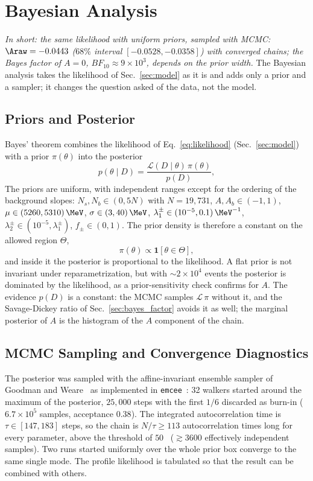 \section{Bayesian Analysis}
\label{sec:bayesian}
\emph{In short: the same likelihood with uniform priors, sampled with MCMC: $\Araw=-0.0443$ ($68\%$ interval $[-0.0528,-0.0358]$) with converged chains; the Bayes factor of $A=0$, $BF_{10}\approx9\times10^3$, depends on the prior width.}
The Bayesian analysis takes the likelihood of Sec.~\ref{sec:model} as it is and adds only a prior and a sampler; it changes the question asked of the data, not the model.
\subsection{Priors and Posterior}
\label{sec:bayes_prior}
Bayes' theorem combines the likelihood of Eq.~\eqref{eq:likelihood} (Sec.~\ref{sec:model}) with a prior $\pi(\theta)$ into the posterior
\begin{equation}
p(\theta\mid D)=\frac{\mathcal{L}(D\mid\theta)\,\pi(\theta)}{p(D)},
\label{eq:bayes}
\end{equation}
The priors are uniform, with independent ranges except for the ordering of the background slopes: $N_s,N_b\in(0,5N)$ with $N=19{,}731$, $A,A_b\in(-1,1)$, $\mu\in(5260,5310)\,\MeV$, $\sigma\in(3,40)\,\MeV$, $\lambda_1^{\pm}\in(10^{-5},0.1)\,\MeV^{-1}$, $\lambda_2^{\pm}\in(10^{-5},\lambda_1^{\pm})$, $f_{\pm}\in(0,1)$. The prior density is therefore a constant on the allowed region $\Theta$,
\begin{equation}
\pi(\theta)\propto\mathbf{1}\left[\theta\in\Theta\right],
\label{eq:prior}
\end{equation}
and inside it the posterior is proportional to the likelihood. A flat prior is not invariant under reparametrization, but with $\sim$$2\times10^4$ events the posterior is dominated by the likelihood, as a prior-sensitivity check confirms for $A$. The evidence $p(D)$ is a constant: the MCMC samples $\mathcal{L}\,\pi$ without it, and the Savage-Dickey ratio of Sec.~\ref{sec:bayes_factor} avoids it as well; the marginal posterior of $A$ is the histogram of the $A$ component of the chain.
\subsection{MCMC Sampling and Convergence Diagnostics}
\label{sec:bayes_mcmc}
The posterior was sampled with the affine-invariant ensemble sampler of Goodman and Weare~\cite{goodman_weare} as implemented in \texttt{emcee}~\cite{emcee}: 32 walkers started around the maximum of the posterior, $25{,}000$ steps with the first $1/6$ discarded as burn-in ($6.7\times10^5$ samples, acceptance $0.38$). The integrated autocorrelation time is $\tau\in[147,183]$ steps, so the chain is $N/\tau\geq113$ autocorrelation times long for every parameter, above the threshold of $50$~\cite{emcee} ($\gtrsim3600$ effectively independent samples). Two runs started uniformly over the whole prior box converge to the same single mode. The profile likelihood is tabulated so that the result can be combined with others.
